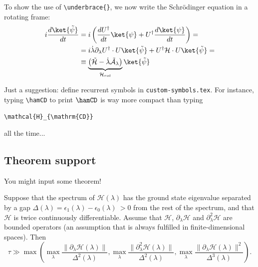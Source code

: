 To show the use of \texttt{\textbackslash underbrace\{\}}, we now write the Schrödinger equation in a rotating frame:
\begin{align}
    i\frac{d\ket{\tilde{\psi}}}{dt} &= i\left( \frac{dU^\dag}{dt}\ket{\psi} + U^\dag \frac{d\ket{\psi}}{dt} \right) = \nonumber\\
    &= i\dot\lambda \partial_\lambda U^\dag \cdot U\ket{\tilde{\psi}} + U^\dag\mathcal{H}\cdot U\ket{\tilde{\psi}} =\nonumber\\
    & \equiv \underbrace{\left( \tilde{\mathcal{H}} - \dot\lambda \tilde{\mathcal{A}}_\lambda \right)}_{\mathcal{H}_{rot}}\ket{\tilde{\psi}} \label{eq:schr-movingframe}
\end{align}

Just a suggestion: define recurrent symbols in \texttt{custom-symbols.tex}. For instance, typing \texttt{\textbackslash hamCD} to print $\hamCD$ is way more compact than typing
\begin{center}
    \texttt{\textbackslash mathcal\{H\}\_\{\textbackslash mathrm\{CD\}\}}
\end{center}
all the time...





\subsection{Theorem support}

You might input some theorem!

\begin{theorem}
Suppose that the spectrum of $\mathcal{H}(\lambda)$ has the ground state eigenvalue separated by a gap $\Delta(\lambda)=\epsilon_1(\lambda)-\epsilon_0(\lambda)\ >0$ from the rest of the spectrum, and that $\mathcal{H}$ is twice continuously differentiable. Assume that $\mathcal{H}$, $\partial_\lambda\mathcal{H}$ and $\partial^2_\lambda\mathcal{H}$ are bounded operators (an assumption that is always fulfilled in finite-dimensional spaces). Then
\begin{equation}
    \tau \gg \max\left(
        \max_\lambda \frac{\|\partial_\lambda\mathcal{H}(\lambda)\|}{\Delta^2(\lambda)},
        \max_\lambda \frac{\|\partial^2_\lambda\mathcal{H}(\lambda)\|}{\Delta^2(\lambda)}, 
        \max_\lambda \frac{\|\partial_\lambda\mathcal{H}(\lambda)\|^2}{\Delta^3(\lambda)}
    \right) .
\end{equation}
\end{theorem}





